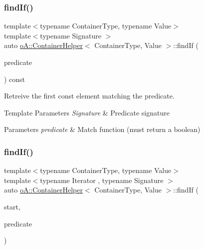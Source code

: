 \subsubsection{\texorpdfstring{find\+If()}{findIf()}\hspace{0.1cm}{\footnotesize\ttfamily [2/4]}}
{\footnotesize\ttfamily template$<$typename Container\+Type, typename Value$>$ \\
template$<$typename Signature $>$ \\
auto \mbox{\hyperlink{classo_a_1_1_container_helper}{o\+A\+::\+Container\+Helper}}$<$ Container\+Type, Value $>$\+::find\+If (\begin{DoxyParamCaption}\item[{const Signature \&}]{predicate }\end{DoxyParamCaption}) const\hspace{0.3cm}{\ttfamily [inline]}}



Retreive the first const element matching the predicate. 


\begin{DoxyTemplParams}{Template Parameters}
{\em Signature} & Predicate signature \\
\hline
\end{DoxyTemplParams}

\begin{DoxyParams}{Parameters}
{\em predicate} & Match function (must return a boolean) \\
\hline
\end{DoxyParams}
\mbox{\label{classo_a_1_1_container_helper_a65c48f0a1d310ae5bb9d1f04509cf0ff}} 
\subsubsection{\texorpdfstring{find\+If()}{findIf()}\hspace{0.1cm}{\footnotesize\ttfamily [3/4]}}
{\footnotesize\ttfamily template$<$typename Container\+Type, typename Value$>$ \\
template$<$typename Iterator , typename Signature $>$ \\
auto \mbox{\hyperlink{classo_a_1_1_container_helper}{o\+A\+::\+Container\+Helper}}$<$ Container\+Type, Value $>$\+::find\+If (\begin{DoxyParamCaption}\item[{Iterator}]{start,  }\item[{const Signature \&}]{predicate }\end{DoxyParamCaption})\hspace{0.3cm}{\ttfamily [inline]}}



